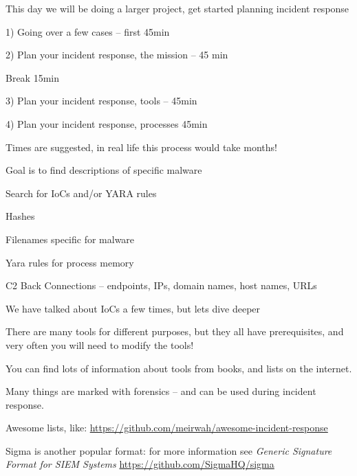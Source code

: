 \documentclass[Screen16to9,17pt]{foils}
\begin{document}

This day we will be doing a larger project, get started planning incident response
\begin{list2}
\item 1) Going over a few cases -- first 45min
\item 2) Plan your incident response, the mission -- 45 min
\item Break 15min
\item 3) Plan your incident response, tools -- 45min
\item 4) Plan your incident response, processes 45min
\end{list2}

Times are suggested, in real life this process would take months!



Goal is to find descriptions of specific malware
\begin{quote}

\end{quote}

Search for IoCs and/or YARA rules
\begin{list2}
\item Hashes
\item Filenames specific for malware
\item Yara rules for process memory
\item C2 Back Connections -- endpoints, IPs, domain names, host names, URLs
\end{list2}




We have talked about IoCs a few times, but lets dive deeper

There are many tools for different purposes, but they all have prerequisites, and very often you will need to modify the tools!

You can find lots of information about tools from books, and lists on the internet.

Many things are marked with forensics -- and can be used during incident response.

\begin{list2}
    \item Awesome lists, like: \url{https://github.com/meirwah/awesome-incident-response}
    \item Sigma is another popular format: for more information see \emph{Generic Signature Format for SIEM Systems}
    \url{https://github.com/SigmaHQ/sigma}
\end{list2}
\end{document}
